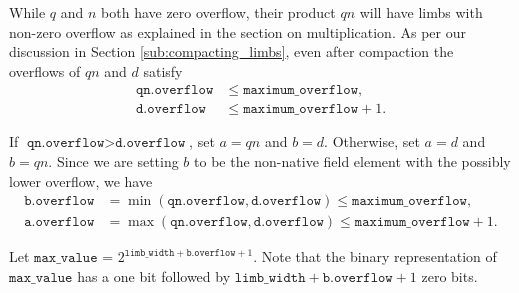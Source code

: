 \documentclass[a4paper, 12pt]{article}
\begin{document}
While $q$ and $n$ both have zero overflow, their product $qn$ will have limbs with non-zero overflow as explained in the section on multiplication. As per our discussion in Section \ref{sub:compacting_limbs}, even after compaction the overflows of $qn$ and $d$ satisfy
\begin{align*}
  \texttt{qn.overflow} & \le \texttt{maximum\_overflow}, \\
  \texttt{d.overflow} &\le \texttt{maximum\_overflow} + 1.
\end{align*}

If $\texttt{qn.overflow} > \texttt{d.overflow}$, set $a = qn$ and $b = d$. Otherwise, set $a = d$ and $b = qn$.
Since we are setting $b$ to be the non-native field element with the possibly lower overflow, we have
\begin{align*}
  \texttt{b.overflow} & = \min(\texttt{qn.overflow}, \texttt{d.overflow}) \le \texttt{maximum\_overflow}, \\
\texttt{a.overflow} & = \max(\texttt{qn.overflow}, \texttt{d.overflow}) \le \texttt{maximum\_overflow} + 1.
\end{align*}

Let $\texttt{max\_value}$ = $2^{\texttt{limb\_width}+\texttt{b.overflow}+1}$. Note that the binary representation of $\texttt{max\_value}$ has a one bit followed by $\texttt{limb\_width} + \texttt{b.overflow}+1$ zero bits. 
\end{document}
